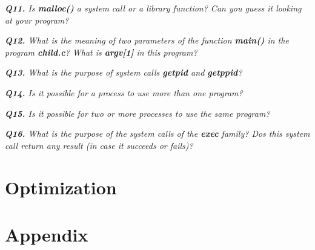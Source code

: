 \documentclass[11pt]{article}
\begin{document}
\vspace{5mm}
\textit{\textbf{Q11.} Is \textbf{malloc()} a system call or a library function? Can you guess it looking at your program?}
\vspace{5mm}


\vspace{5mm}
\textit{\textbf{Q12.} What is the meaning of two parameters of the function \textbf{main()} in the program \textbf{child.c}? What is \textbf{argv[1]} in this program?}
\vspace{5mm}


\vspace{5mm}
\textit{\textbf{Q13.} What is the purpose of system calls \textbf{getpid} and \textbf{getppid}?}
\vspace{5mm}


\vspace{5mm}
\textit{\textbf{Q14.} Is it possible for a process to use more than one program?}
\vspace{5mm}


\vspace{5mm}
\textit{\textbf{Q15.} Is it possible for two or more processes to use the same program?}
\vspace{5mm}

\vspace{5mm}
\textit{\textbf{Q16.} What is the purpose of the system calls of the \textbf{exec} family? Dos this system call return any result (in case it succeeds or fails)?}
\vspace{5mm}


\section*{Optimization}

\newpage

\section*{Appendix}
\end{document}
